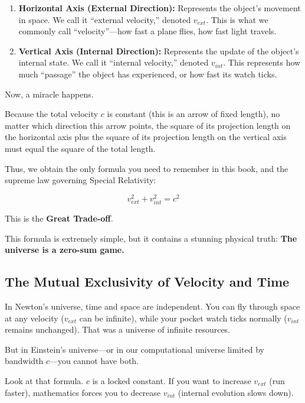 \documentclass[11pt,a4paper,twoside]{book}
\begin{document}
\begin{enumerate}
\item \textbf{Horizontal Axis (External Direction):} Represents the object's movement in space. We call it ``external velocity,'' denoted $v_{ext}$. This is what we commonly call ``velocity''---how fast a plane flies, how fast light travels.

\item \textbf{Vertical Axis (Internal Direction):} Represents the update of the object's internal state. We call it ``internal velocity,'' denoted $v_{int}$. This represents how much ``passage'' the object has experienced, or how fast its watch ticks.
\end{enumerate}

Now, a miracle happens.

Because the total velocity $c$ is constant (this is an arrow of fixed length), no matter which direction this arrow points, the square of its projection length on the horizontal axis plus the square of its projection length on the vertical axis must equal the square of the total length.

Thus, we obtain the only formula you need to remember in this book, and the supreme law governing Special Relativity:

$$v_{ext}^2 + v_{int}^2 = c^2$$

This is the \textbf{Great Trade-off}.

This formula is extremely simple, but it contains a stunning physical truth: \textbf{The universe is a zero-sum game.}

\subsection{The Mutual Exclusivity of Velocity and Time}

In Newton's universe, time and space are independent. You can fly through space at any velocity ($v_{ext}$ can be infinite), while your pocket watch ticks normally ($v_{int}$ remains unchanged). That was a universe of infinite resources.

But in Einstein's universe---or in our computational universe limited by bandwidth $c$---you cannot have both.

Look at that formula. $c$ is a locked constant. If you want to increase $v_{ext}$ (run faster), mathematics forces you to decrease $v_{int}$ (internal evolution slows down).
\end{document}
